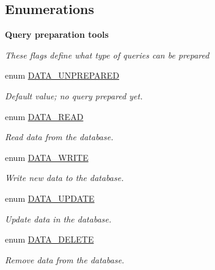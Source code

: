 \subsection*{Enumerations}
\begin{Indent}{\bf Query preparation tools}\par
{\em \label{_amgrpad8db5e6574bdedbb71390d7196cd25c}
 These flags define what type of queries can be prepared }\begin{DoxyCompactItemize}
\item 
enum \hyperlink{class_8datahandler_8php_a21c8184f96d445f8f608321e0e8fffc9}{DATA\_\-UNPREPARED} 
\begin{DoxyCompactList}\small\item\em Default value; no query prepared yet. \item\end{DoxyCompactList}\item 
enum \hyperlink{class_8datahandler_8php_ac28f74b49007773d24ca2207baac6d32}{DATA\_\-READ} 
\begin{DoxyCompactList}\small\item\em Read data from the database. \item\end{DoxyCompactList}\item 
enum \hyperlink{class_8datahandler_8php_a5d8b54a2eb4767a05a2e577c2db9193a}{DATA\_\-WRITE} 
\begin{DoxyCompactList}\small\item\em Write new data to the database. \item\end{DoxyCompactList}\item 
enum \hyperlink{class_8datahandler_8php_a9a817a8e9190bfc1eb884f9b4c3cb7c8}{DATA\_\-UPDATE} 
\begin{DoxyCompactList}\small\item\em Update data in the database. \item\end{DoxyCompactList}\item 
enum \hyperlink{class_8datahandler_8php_ab4fa180fa2d24c38e425ff9ca4c913fa}{DATA\_\-DELETE} 
\begin{DoxyCompactList}\small\item\em Remove data from the database. \item\end{DoxyCompactList}\end{DoxyCompactItemize}
\end{Indent}
